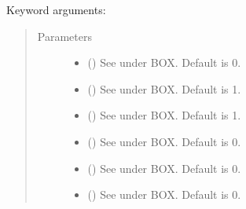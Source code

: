 \documentclass[letterpaper,10pt,english,openany]{sphinxmanual}
\begin{document}
\begin{fulllineitems}
\begin{fulllineitems}
\begin{quote}
\begin{description}
\end{description}\end{quote}

Keyword arguments:
\begin{quote}\begin{description}
\item[{Parameters}] \leavevmode\begin{itemize}
\item {} 
 () \textendash{} See \label{\detokenize{source/sonpy:id9}}{\hyperref[\detokenize{source/users_guide:son15}]{\sphinxcrossref{{[}Son15{]}}}} under BOX. Default is 0.

\item {} 
 () \textendash{} See \label{\detokenize{source/sonpy:id10}}{\hyperref[\detokenize{source/users_guide:son15}]{\sphinxcrossref{{[}Son15{]}}}} under BOX. Default is 1.

\item {} 
 () \textendash{} See \label{\detokenize{source/sonpy:id11}}{\hyperref[\detokenize{source/users_guide:son15}]{\sphinxcrossref{{[}Son15{]}}}} under BOX. Default is 1.

\item {} 
 () \textendash{} See \label{\detokenize{source/sonpy:id12}}{\hyperref[\detokenize{source/users_guide:son15}]{\sphinxcrossref{{[}Son15{]}}}} under BOX. Default is 0.

\item {} 
 () \textendash{} See \label{\detokenize{source/sonpy:id13}}{\hyperref[\detokenize{source/users_guide:son15}]{\sphinxcrossref{{[}Son15{]}}}} under BOX. Default is 0.

\item {} 
 () \textendash{} See \label{\detokenize{source/sonpy:id14}}{\hyperref[\detokenize{source/users_guide:son15}]{\sphinxcrossref{{[}Son15{]}}}} under BOX. Default is 0.


\end{itemize}
\end{description}
\end{quote}
\end{fulllineitems}
\end{fulllineitems}
\end{document}
